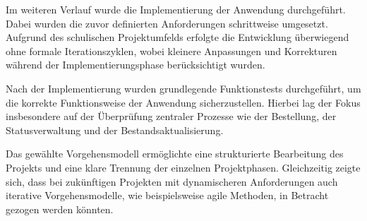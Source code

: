 Im weiteren Verlauf wurde die Implementierung der Anwendung durchgeführt. Dabei wurden die zuvor definierten Anforderungen schrittweise umgesetzt.
Aufgrund des schulischen Projektumfelds erfolgte die Entwicklung überwiegend ohne formale Iterationszyklen, wobei kleinere Anpassungen und Korrekturen
während der Implementierungsphase berücksichtigt wurden.

Nach der Implementierung wurden grundlegende Funktionstests durchgeführt, um die korrekte Funktionsweise der Anwendung sicherzustellen. Hierbei lag
der Fokus insbesondere auf der Überprüfung zentraler Prozesse wie der Bestellung, der Statusverwaltung und der Bestandsaktualisierung.

Das gewählte Vorgehensmodell ermöglichte eine strukturierte Bearbeitung des Projekts und eine klare Trennung der einzelnen Projektphasen.
Gleichzeitig zeigte sich, dass bei zukünftigen Projekten mit dynamischeren Anforderungen auch iterative Vorgehensmodelle, wie beispielsweise agile
Methoden, in Betracht gezogen werden könnten.